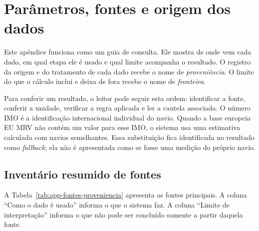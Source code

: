 \chapter{Parâmetros, fontes e origem dos dados}
\label{app:parametros}

Este apêndice funciona como um guia de consulta. Ele mostra de onde vem cada dado, em qual etapa ele é usado e qual limite acompanha o resultado. O registro da origem e do tratamento de cada dado recebe o nome de \emph{proveniência}. O limite do que o cálculo inclui e deixa de fora recebe o nome de \emph{fronteira}.

Para conferir um resultado, o leitor pode seguir esta ordem: identificar a fonte, conferir a unidade, verificar a regra aplicada e ler a cautela associada. O número IMO é a identificação internacional individual do navio. Quando a base europeia EU MRV não contém um valor para esse IMO, o sistema usa uma estimativa calculada com navios semelhantes. Essa substituição fica identificada no resultado como \emph{fallback}; ela não é apresentada como se fosse uma medição do próprio navio.

\section{Inventário resumido de fontes}
\label{sec:app-inventario-fontes}

A Tabela~\ref{tab:app-fontes-proveniencia} apresenta as fontes principais. A coluna ``Como o dado é usado'' informa o que o sistema faz. A coluna ``Limite de interpretação'' informa o que não pode ser concluído somente a partir daquela fonte.

